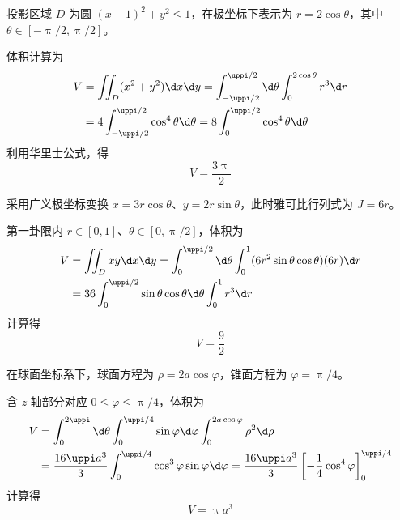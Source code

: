 \begin{solution}
     投影区域 $D$ 为圆 $(x-1)^2 + y^2 \le 1$，在极坐标下表示为 $r = 2\cos \theta$，其中 $\theta \in [-\uppi/2, \uppi/2]$。

    体积计算为
    \begin{equation}
        \begin{aligned}
            V & = \iint_D (x^2 + y^2) \d x \d y = \int_{-\uppi/2}^{\uppi/2} \d \theta \int_0^{2\cos \theta} r^3 \d r \\
              & = 4 \int_{-\uppi/2}^{\uppi/2} \cos^4 \theta \d \theta = 8 \int_0^{\uppi/2} \cos^4 \theta \d \theta
        \end{aligned}
    \end{equation}
    利用华里士公式，得
    \begin{equation}
        V = \boxed{\frac{3\uppi}{2}}
    \end{equation}

     采用广义极坐标变换 $x = 3r \cos \theta$、$y = 2r \sin \theta$，此时雅可比行列式为 $J = 6r$。

    第一卦限内 $r \in [0, 1]$、$\theta \in [0, \uppi/2]$，体积为
    \begin{equation}
        \begin{aligned}
            V & = \iint_D xy \d x \d y = \int_0^{\uppi/2} \d \theta \int_0^1 (6 r^2 \sin \theta \cos \theta) (6r) \d r \\
              & = 36 \int_0^{\uppi/2} \sin \theta \cos \theta \d \theta \int_0^1 r^3 \d r
        \end{aligned}
    \end{equation}
    计算得
    \begin{equation}
        V = \boxed{\frac{9}{2}}
    \end{equation}

     在球面坐标系下，球面方程为 $\rho = 2a \cos \varphi$，锥面方程为 $\varphi = \uppi/4$。

    含 $z$ 轴部分对应 $0 \le \varphi \le \uppi/4$，体积为
    \begin{equation}
        \begin{aligned}
            V & = \int_0^{2\uppi} \d \theta \int_0^{\uppi/4} \sin \varphi \d \varphi \int_0^{2a \cos \varphi} \rho^2 \d \rho                                                   \\
              & = \frac{16\uppi a^3}{3} \int_0^{\uppi/4} \cos^3 \varphi \sin \varphi \d \varphi = \frac{16\uppi a^3}{3} \left[ -\frac{1}{4} \cos^4 \varphi \right]_0^{\uppi/4}
        \end{aligned}
    \end{equation}
    计算得
    \begin{equation}
        V = \boxed{\uppi a^3}
    \end{equation}


\end{solution}
